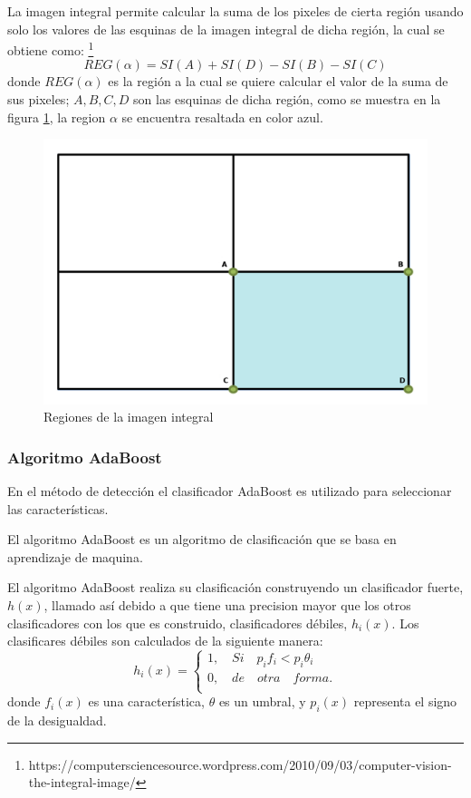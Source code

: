 La imagen integral permite calcular la suma de los pixeles de cierta región usando solo los valores de las esquinas de la imagen integral de dicha región, la cual se obtiene como: \footnote{https://computersciencesource.wordpress.com/2010/09/03/computer-vision-the-integral-image/}   
$$REG(\alpha)=SI(A)+SI(D)-SI(B)-SI(C)$$
donde $REG(\alpha)$ es la región a la cual se quiere calcular el valor de la suma de sus pixeles; $A,B,C,D$ son las esquinas de dicha región, como se muestra en la figura \ref{fig:figImageIntegral}, la region $\alpha$ se encuentra resaltada en color azul.  
\begin{figure}[!h]
\begin{center}
\includegraphics[scale=.3]{./Figures/IntegralImage.png}
\end{center}
\caption{Regiones de la imagen integral}
\label{fig:figImageIntegral}
\end{figure} 


\subsubsection{Algoritmo AdaBoost}\label{sssec:AdaboostClasifier}  

En el método de detección el clasificador AdaBoost es utilizado para seleccionar las características. 

El algoritmo AdaBoost es un algoritmo de clasificación que se basa en aprendizaje de maquina.  

El algoritmo AdaBoost realiza su clasificación construyendo un clasificador fuerte, $h(x)$, llamado así debido a que tiene una precision mayor que los otros clasificadores con los que es construido, clasificadores débiles, $h_i(x)$. Los clasificares débiles son calculados de la siguiente manera: 
$$h_i(x)=
\begin{cases}   
1, \quad Si \quad  p_if_i<p_i \theta_i \\
0, \quad de \quad otra \quad forma.\\
\end{cases}$$
donde $f_i(x)$ es una característica, $\theta$ es un umbral, y $p_i(x)$ representa el signo de la desigualdad.   

